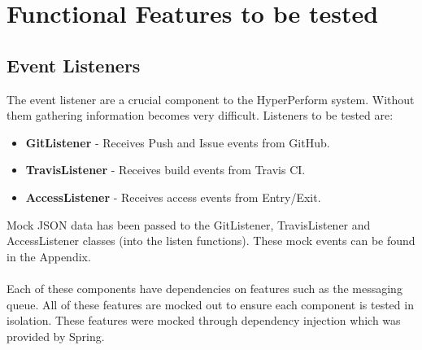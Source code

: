 \documentclass[11pt,a4paper]{article}
\begin{document}
\section{Functional Features to be tested}
%	 

\subsection{Event Listeners}
The event listener are a crucial component to the HyperPerform system. Without them gathering information becomes very difficult. Listeners to be tested are:
\begin{itemize}
	\item \textbf{GitListener} - Receives Push and Issue events from GitHub.
	\item \textbf{TravisListener} - Receives build events from Travis CI.
	\item \textbf{AccessListener} - Receives access events from Entry/Exit.
\end{itemize}

Mock JSON data has been passed to the GitListener, TravisListener and AccessListener classes (into the listen functions). These mock events can be found in the Appendix.\\\\
Each of these components have dependencies on features such as the messaging queue. All of these features are mocked out to ensure each component is tested in isolation. These features were mocked through dependency injection which was provided by Spring. \\
\end{document}
